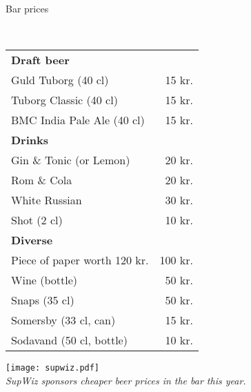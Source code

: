 \begin{flushleft}
\begin{huge}
Bar prices
\end{huge}
\\[.1cm]
\begin{table}[h!]
\begin{tabular}{lr}
\textbf{Draft beer} & \\
Guld Tuborg (40 cl) & 15 kr.\\
Tuborg Classic (40 cl) & 15 kr.\\
BMC India Pale Ale (40 cl) & 15 kr.\\[2ex]
\textbf{Drinks} & \\
Gin \& Tonic (or Lemon) & 20 kr.\\
Rom \& Cola & 20 kr.\\
White Russian & 30 kr.\\
Shot (2 cl) & 10 kr.\\[2ex]
\textbf{Diverse} & \\
Piece of paper worth 120 kr. & 100 kr.\\
Wine (bottle) & 50 kr.\\
Snaps (35 cl) & 50 kr.\\
Somersby (33 cl, can) & 15 kr. \\
Sodavand (50 cl, bottle) & 10 kr.\\
\end{tabular}
\end{table}
\end{flushleft}
\vfill
\begin{center}
\texttt{[image: supwiz.pdf]}
\\[2mm]\emph{SupWiz sponsors cheaper beer prices in the bar this year.}
\end{center}

